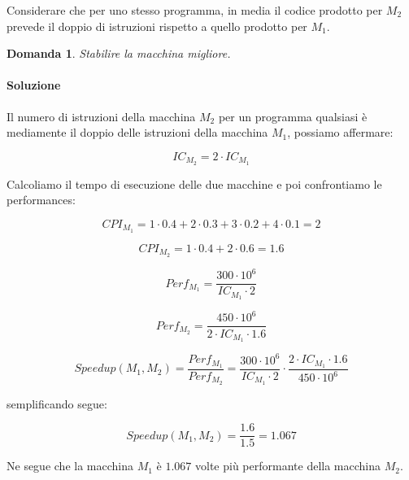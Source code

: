 \documentclass{article}
\newtheorem{domanda}{Domanda}[section]
\begin{document}
    Considerare che per uno stesso programma, in media il codice prodotto per $M_2$ prevede il doppio di istruzioni rispetto a quello prodotto per $M_1$.
    
    \begin{domanda}
    Stabilire la macchina migliore.
    \end{domanda}
    
    \paragraph{Soluzione}
    Il numero di istruzioni della macchina $M_2$ per un programma qualsiasi è mediamente il doppio delle istruzioni della macchina $M_1$, possiamo affermare:
    
    $$IC_{M_2} = 2 \cdot IC_{M_1} $$

    Calcoliamo il tempo di esecuzione delle due macchine e poi confrontiamo le performances:
    
    $$CPI_{M_1}  = 1 \cdot 0.4 + 2 \cdot 0.3 + 3 \cdot 0.2 + 4 \cdot 0.1 = 2$$
    
    $$CPI_{M_2}  = 1 \cdot 0.4 + 2 \cdot 0.6 = 1.6$$
    
    $$Perf_{M_1} = \frac{300 \cdot 10^6}{IC_{M_1} \cdot 2}$$

    $$Perf_{M_2} = \frac{450 \cdot 10^6}{2\cdot IC_{M_1} \cdot 1.6}$$
    
    $$Speedup(M_1, M_2) = \frac{Perf_{M_1}}{Perf_{M_2}} = \frac{300 \cdot 10^6}{IC_{M_1} \cdot 2} \cdot \frac{2 \cdot IC_{M_1} \cdot 1.6}{450 \cdot 10^6} $$
    
    semplificando segue:
    
    $$Speedup(M_1, M_2) = \frac{1.6}{1.5} = 1.067$$
    
    Ne segue che la macchina $M_1$ è $1.067$ volte più performante della macchina $M_2$.
    
    
    
    
\end{document}
